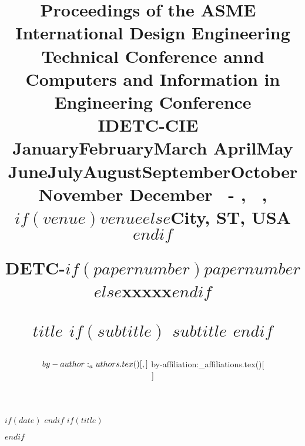 \usepackage{advdate}
$if(date)$
\SetDate[$date$]
\FixDate
$endif$
\newcommand{\daterange}{
  \ifcase \the\month \or January\or February\or March\or %
    April\or May \or June\or July\or August\or September\or October\or November\or %
    December
  \fi
  ~\the\day -\AdvanceDate[3]\the\day
  ,~\the\year
}
$if(title)$
\title{
  \bfseries\sffamily\normalsize
  \begin{flushright}
    \vspace*{-2\baselineskip}
    {\fontsize{11pt}{12pt}\selectfont Proceedings of the ASME~\the\year\\International Design Engineering Technical Conference annd\\
      Computers and Information in Engineering Conference\\
      IDETC-CIE~\the\year\\
      \daterange, $if(venue)$$venue$$else$City, ST, USA$endif$\\}

    \vspace*{2\baselineskip}
    {\LARGE DETC\the\year -$if(papernumber)$$papernumber$$else$xxxxx$endif$}\\
    \vspace*{2.5\baselineskip}
  \end{flushright}
  \large\MakeUppercase{$title$}
  $if(subtitle)$
  \vspace*{0.5\baselineskip}
  \normalsize{$subtitle$}
  $endif$
}
$endif$

\author{${  by-author:_authors.tex()[, ] }\vspace{\baselineskip}\\ ${  by-affiliation:_affiliations.tex()[\\ ] }}

\date{ }